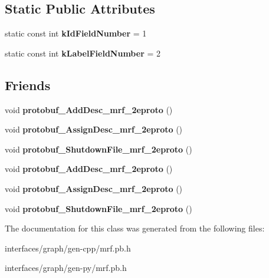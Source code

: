 \subsection*{Static Public Attributes}
\begin{DoxyCompactItemize}
\item 
\hypertarget{classgraph_1_1State_a150e9e7c58dd46aaf1dd05cddf8bbb96}{
static const int {\bfseries kIdFieldNumber} = 1}
\label{classgraph_1_1State_a150e9e7c58dd46aaf1dd05cddf8bbb96}

\item 
\hypertarget{classgraph_1_1State_a47c9ea89be631c1a5135c0b2d89a9ee4}{
static const int {\bfseries kLabelFieldNumber} = 2}
\label{classgraph_1_1State_a47c9ea89be631c1a5135c0b2d89a9ee4}

\end{DoxyCompactItemize}
\subsection*{Friends}
\begin{DoxyCompactItemize}
\item 
\hypertarget{classgraph_1_1State_a7c7daba01236a33140ac99dfb4a21f58}{
void {\bfseries protobuf\_\-AddDesc\_\-mrf\_\-2eproto} ()}
\label{classgraph_1_1State_a7c7daba01236a33140ac99dfb4a21f58}

\item 
\hypertarget{classgraph_1_1State_aef3db81db7837e30d95a050165bc180f}{
void {\bfseries protobuf\_\-AssignDesc\_\-mrf\_\-2eproto} ()}
\label{classgraph_1_1State_aef3db81db7837e30d95a050165bc180f}

\item 
\hypertarget{classgraph_1_1State_a84e801a5b8303ac698fb7040b250e3d1}{
void {\bfseries protobuf\_\-ShutdownFile\_\-mrf\_\-2eproto} ()}
\label{classgraph_1_1State_a84e801a5b8303ac698fb7040b250e3d1}

\item 
\hypertarget{classgraph_1_1State_a7c7daba01236a33140ac99dfb4a21f58}{
void {\bfseries protobuf\_\-AddDesc\_\-mrf\_\-2eproto} ()}
\label{classgraph_1_1State_a7c7daba01236a33140ac99dfb4a21f58}

\item 
\hypertarget{classgraph_1_1State_aef3db81db7837e30d95a050165bc180f}{
void {\bfseries protobuf\_\-AssignDesc\_\-mrf\_\-2eproto} ()}
\label{classgraph_1_1State_aef3db81db7837e30d95a050165bc180f}

\item 
\hypertarget{classgraph_1_1State_a84e801a5b8303ac698fb7040b250e3d1}{
void {\bfseries protobuf\_\-ShutdownFile\_\-mrf\_\-2eproto} ()}
\label{classgraph_1_1State_a84e801a5b8303ac698fb7040b250e3d1}

\end{DoxyCompactItemize}


The documentation for this class was generated from the following files:\begin{DoxyCompactItemize}
\item 
interfaces/graph/gen-\/cpp/mrf.pb.h\item 
interfaces/graph/gen-\/py/mrf.pb.h\end{DoxyCompactItemize}
